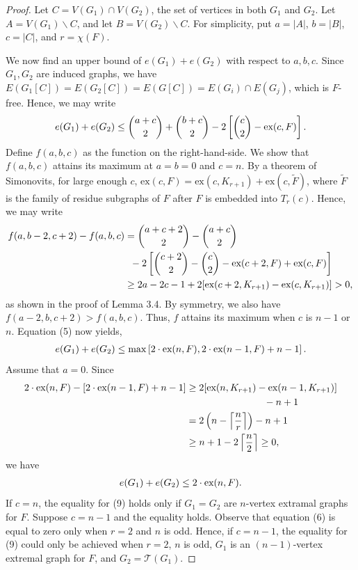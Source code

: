 \documentclass[a4paper]{article}
\begin{document}
\begin{proof}
  Let $C = V(G_1) \cap V(G_2)$, the set of vertices in both $G_1$ and $G_2$. Let $A = V(G_1)
  \backslash C$, and let $B = V(G_2) \backslash C$. For simplicity, put $a = |A|$, $b = |B|$, $c
  = |C|$, and $r = \chi(F)$.

  We now find an upper bound of $e(G_1) + e(G_2)$ with respect to $a, b, c$. Since $G_1, G_2$ are
  induced graphs, we have $E(G_1[C]) = E(G_2[C]) = E(G[C]) = E(G_i) \cap E(G_j)$, which is $F$-free.
  Hence, we may write
  \begin{gather}
    e(G_1) + e(G_2) \leq \binom{a + c}{2} +  \binom{b + c}{2} - 2\left[\binom{c}{2} - \textnormal{ex}(c, F)\right].
  \end{gather}
  Define $f(a, b, c)$ as the function on the right-hand-side. We show that $f(a, b, c)$ attains its
  maximum at $a = b = 0$ and $c = n$. By a theorem of Simonovits, for large enough $c$,
  $\text{ex}(c, F) = \text{ex}(c, K_{r + 1}) + \text{ex}(c, \tilde{F})$, where $\tilde{F}$ is the
  family of residue subgraphs of $F$ after $F$ is embedded into $T_r(c)$. Hence, we may write
  \begin{align*}
    f(a, b - 2, c + 2) - f(a, b, c)
    &= \binom{a + c + 2}{2} - \binom{a + c}{2} \\
    &\;\; - 2\left[\binom{c + 2}{2} - \binom{c}{2} - \textnormal{ex}(c + 2, F) + \textnormal{ex}(c, F)\right] \\
    &\geq 2a - 2c - 1 + 2[\textnormal{ex}(c + 2, K_{r + 1}) - \textnormal{ex}(c, K_{r + 1})] > 0,
  \end{align*}
  as shown in the proof of Lemma 3.4. By symmetry, we also have $f(a - 2, b, c + 2) > f(a, b, c)$.
  Thus, $f$ attains its maximum when $c$ is $n - 1$ or $n$. Equation (5) now yields, 
  \begin{align*}
    e(G_1) + e(G_2) \leq \max\left[2 \cdot \textnormal{ex}(n, F), 2 \cdot \textnormal{ex}(n - 1, F) + n - 1\right].
  \end{align*}
  Assume that $a = 0$. Since
  \begin{align}
    2 \cdot \textnormal{ex}(n, F) - [2 \cdot \textnormal{ex}(n - 1, F) + n - 1]
    &\geq 2[\textnormal{ex}(n, K_{r + 1}) - \textnormal{ex}(n - 1, K_{r + 1})] \\
    &\qquad\qquad\qquad\qquad - n + 1 \\
    &= 2\left(n - \left\lceil \frac{n}{r} \right\rceil\right) - n + 1 \\
    &\geq n + 1 - 2\left\lceil \frac{n}{2} \right\rceil \geq 0, \nonumber
  \end{align}
  we have
  \begin{gather}
    e(G_1) + e(G_2) \leq 2 \cdot \textnormal{ex}(n, F).
  \end{gather}
  If $c = n$, the equality for (9) holds only if $G_1 = G_2$ are $n$-vertex extramal graphs for $F$.
  Suppose $c = n - 1$ and the equality holds. Observe that equation (6) is equal to zero only when
  $r = 2$ and $n$ is odd. Hence, if $c = n - 1$, the equality for (9) could only be achieved when $r
  = 2$, $n$ is odd, $G_1$ is an $(n - 1)$-vertex extremal graph for $F$, and $G_2 =
  \mathcal{T}(G_1)$.
\end{proof}
\end{document}
